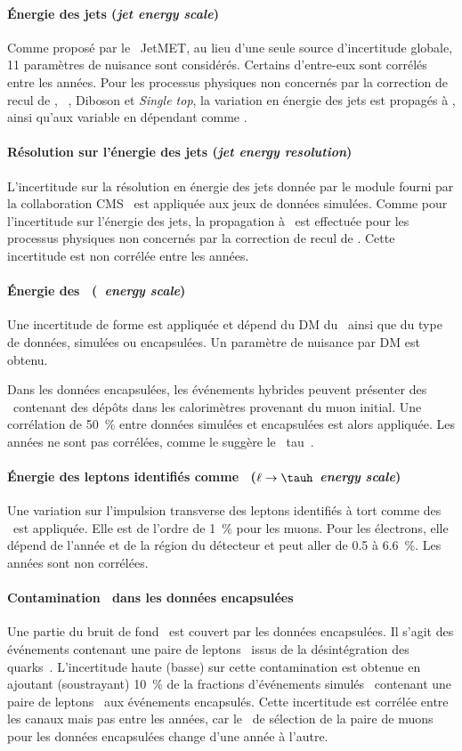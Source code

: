 \paragraph{Énergie des jets (\emph{jet energy scale})}
Comme proposé par le \POG\ JetMET, au lieu d'une seule source d'incertitude globale, 11 paramètres de nuisance sont considérés.
Certains d'entre-eux sont corrélés entre les années.
Pour les processus physiques non concernés par la correction de recul de \MET, \ie\ \ttbar, Diboson et \emph{Single top}, la variation en énergie des jets est propagés à \MET, ainsi qu'aux variable en dépendant comme \mTtot.
\paragraph{Résolution sur l'énergie des jets (\emph{jet energy resolution})}
L'incertitude sur la résolution en énergie des jets donnée par le module fourni par la collaboration CMS~\cite{JetResolution} est appliquée aux jeux de données simulées.
Comme pour l'incertitude sur l'énergie des jets, la propagation à \MET\ est effectuée pour les processus physiques non concernés par la correction de recul de \MET.
Cette incertitude est non corrélée entre les années.
\paragraph{Énergie des \tauh\ (\emph{\tauh\ energy scale})}
Une incertitude de forme est appliquée et dépend du DM du \tauh\ ainsi que du type de données, simulées ou encapsulées.
Un paramètre de nuisance par DM est obtenu.
\par
Dans les données encapsulées, les événements hybrides peuvent présenter des \tauh\ contenant des dépôts dans les calorimètres provenant du muon initial.
Une corrélation de \SI{50}{\%} entre données simulées et encapsulées est alors appliquée.
Les années ne sont pas corrélées, comme le suggère le \POG\ tau~\cite{TauPOG}.
\paragraph{Énergie des leptons identifiés comme \tauh\ (\emph{$\ell\to\tauh$ energy scale})}
Une variation sur l'impulsion transverse des leptons identifiés à tort comme des \tauh\ est appliquée.
Elle est de l'ordre de \SI{1}{\%} pour les muons.
Pour les électrons, elle dépend de l'année et de la région du détecteur et peut aller de \num{0.5} à \SI{6.6}{\%}.
Les années sont non corrélées.
\paragraph{Contamination \ttbar\ dans les données encapsulées}
Une partie du bruit de fond \ttbar\ est couvert par les données encapsulées.
Il s'agit des événements contenant une paire de leptons \tau\ issus de la désintégration des quarks~\quarkt.
L'incertitude haute (basse) sur cette contamination est obtenue en ajoutant (soustrayant) \SI{10}{\%} de la fractions d'événements simulés \ttbar\ contenant une paire de leptons \tau\ aux événements encapsulés.
Cette incertitude est corrélée entre les canaux mais pas entre les années, car le \HLTpath\ de sélection de la paire de muons pour les données encapsulées change d'une année à l'autre.
